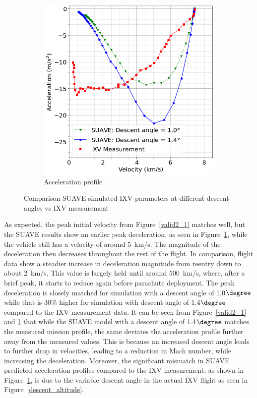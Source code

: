 \documentclass[%
 aip,
 amsmath,amssymb,
preprint,%
]{revtex4-1}
\begin{document}
\begin{figure}[ht]
\begin{subfigure}[b]{0.49\textwidth}
\includegraphics[width=\textwidth]{IXV_deceleration_1976.png}
\caption{Acceleration profile}
\label{valid2_2}
\end{subfigure}
\caption{Comparison SUAVE simulated IXV parameters at different descent angles vs IXV measurement}
\label{valid2}
\end{figure}

As expected, the peak initial velocity from Figure~\ref{valid2_1} matches well, but the SUAVE results show an earlier peak deceleration, as seen in Figure~\ref{valid2_2}, while the vehicle still has a velocity of around 5~km/s. The magnitude of the deceleration then decreases throughout the rest of the flight. In comparison, flight data show a steadier increase in deceleration magnitude from reentry down to about 2~km/s. This value is largely held until around 500~km/s, where, after a brief peak, it starts to reduce again before parachute deployment. The peak deceleration is closely matched for simulation with a descent angle of 1.0$\degree$ while that is 30\% higher for simulation with descent angle of 1.4$\degree$ compared to the IXV measurement data.
It can be seen from Figure~\ref{valid2_1} and \ref{valid2_2} that while the SUAVE model with a descent angle of 1.4$\degree$ matches the measured mission profile, the same deviates the acceleration profile further away from the measured values. This is because an increased descent angle leads to further drop in velocities, leading to a reduction in Mach number, while increasing the deceleration. Moreover, the significant mismatch in SUAVE predicted acceleration profiles compared to the IXV measurement, as shown in Figure~\ref{valid2_2}, is due to the variable descent angle in the actual IXV flight as seen in Figure~\ref{descent_altitude}.
\end{document}
